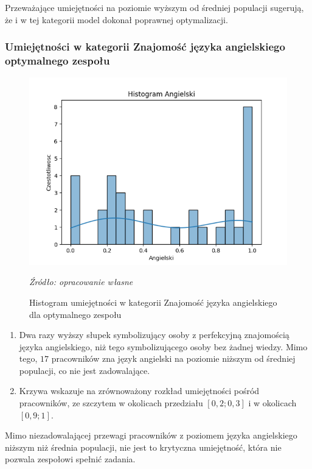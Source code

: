         \par Przeważające umiejętności na poziomie wyższym od średniej populacji sugerują, że i w tej kategorii model dokonał poprawnej optymalizacji.
        
        \subsubsection{Umiejętności w kategorii Znajomość języka angielskiego optymalnego zespołu}
        \begin{figure}[H]
            \centering
            \includegraphics[width=\linewidth]{chapters/Images/hist_ang_optimal.png}
            \cprotect\caption{Histogram umiejętności w kategorii Znajomość języka angielskiego dla optymalnego zespołu}
            \textit{Źródło: opracowanie własne} 
            \label{fig:hist_ang_optimal}
        \end{figure}

        \begin{enumerate}
            \item Dwa razy wyższy słupek symbolizujący osoby z perfekcyjną znajomością języka angielskiego, niż tego symbolizującego osoby bez żadnej wiedzy. Mimo tego, $17$ pracowników zna język angielski na poziomie niższym od średniej populacji, co nie jest zadowalające.
            \item Krzywa wskazuje na zrównoważony rozkład umiejętności pośród pracowników, ze szczytem w okolicach przedziału $[0,2; 0,3]$ i w okolicach $[0,9; 1]$.
        \end{enumerate}

        \par Mimo niezadowalającej przewagi pracowników z poziomem języka angielskiego niższym niż średnia populacji, nie jest to krytyczna umiejętność, która nie pozwala zespołowi spełnić zadania.
        
